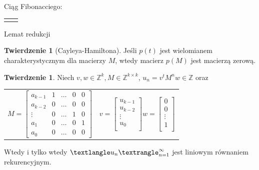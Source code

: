 \documentclass[handout]{beamer}
\def\Z{\mathbb Z}
\theoremstyle{definition}
\newtheorem*{twierdzenie}{Twierdzenie}
\theoremstyle{named}
\newtheorem*{namedtheorem}{Twierdzenie}
\begin{document}
\begin{frame}{Ciąg Fibonacciego:}
\begin{table}[]
\begin{tabular}{c|c}
\begin{equation*}
    \end{equation*}

    \end{tabular}
\end{table}


\end{frame}

\begin{frame}{Lemat redukcji}

\begin{namedtheorem}[Cayleya-Hamiltona]
    Jeśli $p(t)$ jest wielomianem charakterystycznym dla macierzy $M$, wtedy macierz $p(M)$ jest macierzą zerową. 
\end{namedtheorem}

\pause
\begin{twierdzenie}

    Niech $v, w \in \Z^{k}, M \in \Z^{k\times k}$,  $u_n = v^{t}M^{n}w \in \Z$ oraz
    \begin{table}[]
        \centering
        \begin{tabular}{c c}
    $
        M = \begin{bmatrix}
        a_{k-1} & 1 & \ldots & 0 & 0 \\
        a_{k-2} & 0 & \ldots & 0 & 0 \\
        \vdots & 0 & \ldots & 1 & 0 \\ 
        a_1 & 0 & \ldots & 0 & 1 \\
        a_0 & 0 & \ldots & 0 & 0
        \end{bmatrix}
    $
             &  
                $v= \begin{bmatrix}
                u_{k-1} \\ u_{k-2} \\ \vdots \\ u_{0} \\
                \end{bmatrix}
                w =  \begin{bmatrix}
                0 \\ 0 \\ \vdots \\ 1 \\
                \end{bmatrix}
                $
             & 
        \end{tabular}

    \end{table}
    
    Wtedy i tylko wtedy $\textlangle u_n \textrangle_{n=1}^{\infty}$ jest liniowym równaniem rekurencyjnym. 

\end{twierdzenie}

\end{frame}
\end{document}
